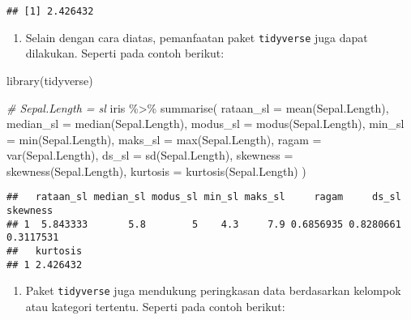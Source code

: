 \documentclass[
]{book}
\newenvironment{Shaded}{\begin{snugshade}}{\end{snugshade}}
\newcommand{\AttributeTok}[1]{\textcolor[rgb]{0.77,0.63,0.00}{#1}}
\newcommand{\CommentTok}[1]{\textcolor[rgb]{0.56,0.35,0.01}{\textit{#1}}}
\newcommand{\FunctionTok}[1]{\textcolor[rgb]{0.00,0.00,0.00}{#1}}
\newcommand{\NormalTok}[1]{#1}
\newcommand{\SpecialCharTok}[1]{\textcolor[rgb]{0.00,0.00,0.00}{#1}}
\providecommand{\tightlist}{%
  \setlength{\itemsep}{0pt}\setlength{\parskip}{0pt}}
\begin{document}
\begin{verbatim}
## [1] 2.426432
\end{verbatim}

\begin{enumerate}
\def\labelenumi{\arabic{enumi}.}
\setcounter{enumi}{3}
\tightlist
\item
  Selain dengan cara diatas, pemanfaatan paket \texttt{tidyverse} juga dapat dilakukan. Seperti pada contoh berikut:
\end{enumerate}

\begin{Shaded}
\begin{Highlighting}[]
\FunctionTok{library}\NormalTok{(tidyverse)}

\CommentTok{\# Sepal.Length = sl}
\NormalTok{iris }\SpecialCharTok{\%\textgreater{}\%} \FunctionTok{summarise}\NormalTok{(}
  \AttributeTok{rataan\_sl =} \FunctionTok{mean}\NormalTok{(Sepal.Length),}
  \AttributeTok{median\_sl =} \FunctionTok{median}\NormalTok{(Sepal.Length),}
  \AttributeTok{modus\_sl  =} \FunctionTok{modus}\NormalTok{(Sepal.Length),}
  \AttributeTok{min\_sl    =} \FunctionTok{min}\NormalTok{(Sepal.Length),}
  \AttributeTok{maks\_sl   =} \FunctionTok{max}\NormalTok{(Sepal.Length),}
  \AttributeTok{ragam     =} \FunctionTok{var}\NormalTok{(Sepal.Length),}
  \AttributeTok{ds\_sl     =} \FunctionTok{sd}\NormalTok{(Sepal.Length),}
  \AttributeTok{skewness  =} \FunctionTok{skewness}\NormalTok{(Sepal.Length),}
  \AttributeTok{kurtosis  =} \FunctionTok{kurtosis}\NormalTok{(Sepal.Length)}
\NormalTok{)}
\end{Highlighting}
\end{Shaded}

\begin{verbatim}
##   rataan_sl median_sl modus_sl min_sl maks_sl     ragam     ds_sl  skewness
## 1  5.843333       5.8        5    4.3     7.9 0.6856935 0.8280661 0.3117531
##   kurtosis
## 1 2.426432
\end{verbatim}

\begin{enumerate}
\def\labelenumi{\arabic{enumi}.}
\setcounter{enumi}{4}
\tightlist
\item
  Paket \texttt{tidyverse} juga mendukung peringkasan data berdasarkan kelompok atau kategori tertentu. Seperti pada contoh berikut:
\end{enumerate}
\end{document}
